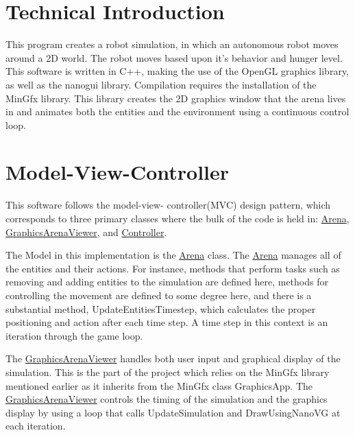 \hypertarget{index_intro_sec}{}\section{Technical Introduction}\label{index_intro_sec}
This program creates a robot simulation, in which an autonomous robot moves around a 2D world. The robot moves based upon it’s behavior and hunger level. This software is written in C++, making the use of the Open\+GL graphics library, as well as the nanogui library. Compilation requires the installation of the Min\+Gfx library. This library creates the 2D graphics window that the arena lives in and animates both the entities and the environment using a continuous control loop.\hypertarget{index_mvc_sec}{}\section{Model-\/\+View-\/\+Controller}\label{index_mvc_sec}
This software follows the model-\/view-\/ controller(\+M\+V\+C) design pattern, which corresponds to three primary classes where the bulk of the code is held in\+: \mbox{\hyperlink{class_arena}{Arena}}, \mbox{\hyperlink{class_graphics_arena_viewer}{Graphics\+Arena\+Viewer}}, and \mbox{\hyperlink{class_controller}{Controller}}.

The Model in this implementation is the \mbox{\hyperlink{class_arena}{Arena}} class. The \mbox{\hyperlink{class_arena}{Arena}} manages all of the entities and their actions. For instance, methods that perform tasks such as removing and adding entities to the simulation are defined here, methods for controlling the movement are defined to some degree here, and there is a substantial method, Update\+Entities\+Timestep, which calculates the proper positioning and action after each time step. A time step in this context is an iteration through the game loop.

The \mbox{\hyperlink{class_graphics_arena_viewer}{Graphics\+Arena\+Viewer}} handles both user input and graphical display of the simulation. This is the part of the project which relies on the Min\+Gfx library mentioned earlier as it inherits from the Min\+Gfx class Graphics\+App. The \mbox{\hyperlink{class_graphics_arena_viewer}{Graphics\+Arena\+Viewer}} controls the timing of the simulation and the graphics display by using a loop that calls Update\+Simulation and Draw\+Using\+Nano\+VG at each iteration.

